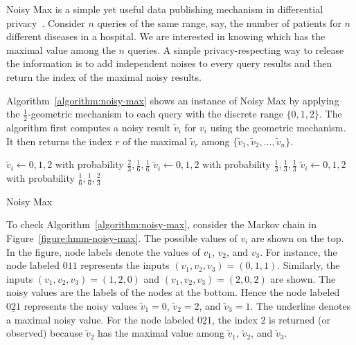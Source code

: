 
Noisy Max is a simple yet useful data publishing mechanism in
differential privacy~\cite{DR:14:AFDP,DWWZK:18:DVDP}. Consider $n$
queries of the same range, say, the number of patients for $n$
different diseases in a hospital. We are interested in knowing which
has the maximal value among the $n$ queries. A simple
privacy-respecting way to release the information is to add
independent noises to every query results and then return the index of
the maximal noisy results.

Algorithm~\ref{algorithm:noisy-max} shows an instance of Noisy Max by
applying the $\frac{1}{2}$-geometric mechanism to each query with
the discrete range $\{ 0, 1, 2 \}$. The algorithm first computes
a noisy result $\tilde{v}_i$ for $v_i$ using the geometric
mechanism. It then returns the index $r$ of the maximal
$\tilde{v}_r$ among $\{ \tilde{v}_1, \tilde{v}_2, \ldots, \tilde{v}_n
\}$. 
 

\begin{algorithm}
  \begin{algorithmic}[1]
                {$\tilde{v}_i \leftarrow 0, 1, 2$ with probability
                 $\frac{2}{3}, \frac{1}{6}, \frac{1}{6}$}
                {$\tilde{v}_i \leftarrow 0, 1, 2$ with probability
                 $\frac{1}{3}, \frac{1}{3}, \frac{1}{3}$}
                {$\tilde{v}_i \leftarrow 0, 1, 2$ with probability
                 $\frac{1}{6}, \frac{1}{6}, \frac{2}{3}$}
        \EndMatch
      \EndFor
    \EndFunction
  \end{algorithmic}
  \caption{Noisy Max}
  \label{algorithm:noisy-max}
\end{algorithm}

To check Algorithm~\ref{algorithm:noisy-max}, consider the Markov
chain in Figure~\ref{figure:hmm-noisy-max}. The possible values of
$v_i$ are shown on the top. In the figure, node labels denote the
values of $v_1$, $v_2$, and $v_3$. For instance, the node labeled
$011$ represents the inputs $(v_1, v_2, v_3) = (0, 1, 1)$. Similarly,
the inputs $(v_1, v_2, v_3) = (1, 2, 0)$ and $(v_1, v_2, v_3) = (2, 0,
2)$ are shown.
The noisy values are the labels of the nodes at the bottom. 
Hence the node labeled $0\underline{2}1$ represents the noisy values
$\tilde{v}_1 = 0$, 
$\tilde{v}_2 = 2$, and $\tilde{v}_3 = 1$. The underline denotes a
maximal noisy value. For the node labeled $0\underline{2}1$, the index
$2$ is returned (or observed) because $\tilde{v}_2$ has the maximal
value among $\tilde{v}_1$, $\tilde{v}_2$, and $\tilde{v}_3$.

